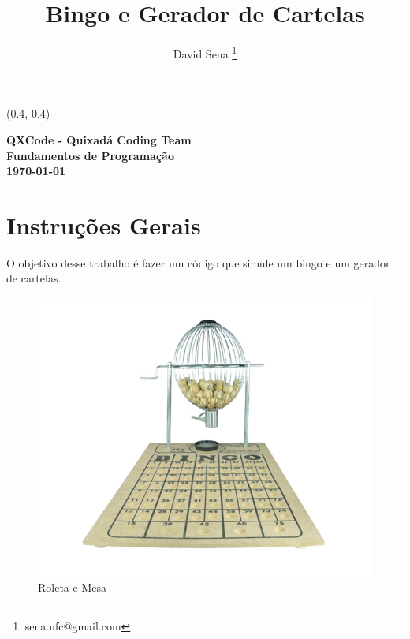 \documentclass[12pt]{article}
\renewcommand{\bf}[1]{\textbf{#1}}
\begin{document}

\begin{textblock}{15}(0.4, 0.4)
\noindent
\begin{center}
\LARGE{\bf{QXCode - Quixadá Coding Team}}\\
\large{\bf{Fundamentos de Programação}} \\
\large{\bf{\today}}
\end{center}
\end{textblock}

\title{\bf{Bingo e Gerador de Cartelas}}

\author{
David Sena \thanks{sena.ufc@gmail.com}
}

\date{}

\maketitle
\thispagestyle{empty}



\section{Instruções Gerais}
O objetivo desse trabalho é fazer um código
que simule um bingo e um gerador de cartelas. 

\begin{figure}[hf]
\centering
\includegraphics[width=0.8\linewidth]{./imagens/roleta}
\caption{Roleta e Mesa}
\end{figure}
\end{document}

